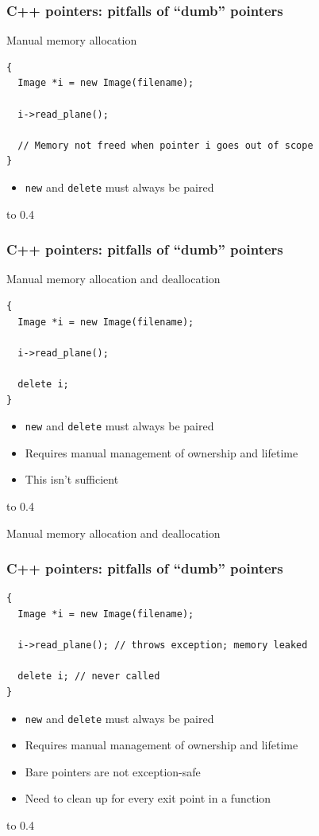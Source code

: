 \documentclass[handout]{beamer}
\begin{document}
\begin{frame}[fragile]
  \frametitle{C++ pointers: pitfalls of “dumb” pointers}
\begin{block}{Manual memory allocation}
  \begin{lstlisting}
{
  Image *i = new Image(filename);

  i->read_plane();

  // Memory not freed when pointer i goes out of scope
}
\end{lstlisting}
  \begin{itemize}
    \pause
  \item \texttt{new} and \texttt{delete} must always be paired
  \end{itemize}
\end{block}
\vbox to 0.4\textheight{%
}%
\end{frame}

\begin{frame}[fragile]
  \frametitle{C++ pointers: pitfalls of “dumb” pointers}
\begin{block}{Manual memory allocation and deallocation}
  \begin{lstlisting}
{
  Image *i = new Image(filename);

  i->read_plane();

  delete i;
}
\end{lstlisting}
  \begin{itemize}
  \item \texttt{new} and \texttt{delete} must always be paired
  \item Requires manual management of ownership and lifetime
    \pause
  \item This isn't sufficient
  \end{itemize}
\end{block}
\vbox to 0.4\textheight{%
}%
\end{frame}

\begin{frame}[fragile]
\begin{block}{Manual memory allocation and deallocation}
  \frametitle{C++ pointers: pitfalls of “dumb” pointers}
  \begin{lstlisting}
{
  Image *i = new Image(filename);

  i->read_plane(); // throws exception; memory leaked

  delete i; // never called
}
\end{lstlisting}
  \begin{itemize}
  \item \texttt{new} and \texttt{delete} must always be paired
  \item Requires manual management of ownership and lifetime
  \item Bare pointers are not exception-safe
    \pause
  \item Need to clean up for every exit point in a function
  \end{itemize}
\end{block}
\vbox to 0.4\textheight{%
}%
\end{frame}
\end{document}
